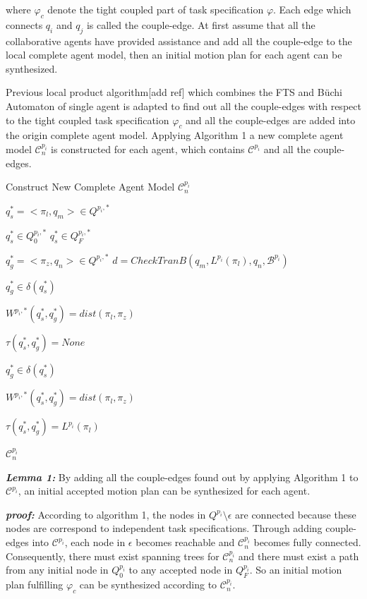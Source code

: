 \documentclass[journal]{IEEEtran}
\begin{document}
where $\varphi_c$ denote the tight coupled part of task specification $\varphi$.
Each edge which connects $q_i$ and $q_j$ is called the couple-edge.
At first assume that all the collaborative agents have provided assistance and add all the couple-edge to the local complete agent model, then an initial motion plan for each agent can be synthesized.\par
Previous local product algorithm[add ref] which combines the FTS and B\"{u}chi Automaton of single agent is adapted to find out all the couple-edges with respect to the tight coupled task specification $\varphi_c$ and all the couple-edges are added into the origin complete agent model. Applying Algorithm 1 a new complete agent model $\mathcal{C}^{p_i}_n$ is constructed for each agent, which contains $\mathcal{C}^{p_i}$ and all the couple-edges.\par
\begin{algorithm}
  \caption{Construct New Complete Agent Model $\mathcal{C}^{p_i}_n$}
  {
    $q^{\ast}_s=<\pi_l,q_m>\in Q^{p_i,\ast}$

    {
        $q^{\ast}_s\in Q^{p_i,\ast}_0$
    }
    {
        $q^{\ast}_s\in Q^{p_i,\ast}_F$
    }
    {
        $q^{\ast}_g=<\pi_z,q_n>\in Q^{p_i,\ast}$
        $d = CheckTranB(q_m,L^{p_i}(\pi_l),q_n,\mathcal{B}^{p_i})$

        {
            $q^{\ast}_g\in \delta(q^{\ast}_s)$

            $W^{p_i,\ast}(q^{\ast}_s,q^{\ast}_g)=dist(\pi_l,\pi_z)$

            $\tau(q^{\ast}_s,q^{\ast}_g) = None$
        }
        \Else
        {
            {
                $q^{\ast}_g\in \delta(q^{\ast}_s)$

                $W^{p_i,\ast}(q^{\ast}_s,q^{\ast}_g)=dist(\pi_l,\pi_z)$

                $\tau(q^{\ast}_s,q^{\ast}_g)=L^{p_i}(\pi_l)$
            }
        }
    }
  }
  \Return $\mathcal{C}^{p_i}_n$
\end{algorithm}

\textbf{\emph{Lemma 1:}} By adding all the couple-edges found out by applying Algorithm 1 to $\mathcal{C}^{p_i}$, an initial accepted motion plan can be synthesized for each agent.\par
\textbf{\emph{proof:}} According to algorithm 1, the nodes in $Q^{p_i} \setminus \epsilon$ are connected because these nodes are correspond to independent task specifications. Through adding couple-edges into $\mathcal{C}^{p_i}$, each node in $\epsilon$ becomes reachable and $\mathcal{C}^{p_i}_n$ becomes fully connected. Consequently, there must exist spanning trees for $\mathcal{C}^{p_i}_n$ and there must exist a path from any initial node in $Q_0^{p_i}$ to any accepted node in $Q_F^{p_i}$. So an initial motion plan fulfilling $\varphi_c$ can be synthesized according to $\mathcal{C}^{p_i}_n$.
\end{document}
